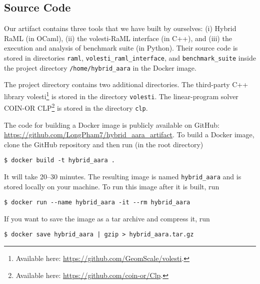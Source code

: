 \subsection{Source Code}

Our artifact contains three tools that we have built by ourselves: (i) Hybrid
RaML (in OCaml), (ii) the volesti-RaML interface (in C++), and (iii) the
execution and analysis of benchmark suite (in Python).
%
Their source code is stored in directories \texttt{raml},
\texttt{volesti\_raml\_interface}, and \texttt{benchmark\_suite} inside the
project directory \texttt{/home/hybrid\_aara} in the Docker image.

The project directory contains two additional directories.
%
The third-party C++ library volesti\footnote{Available here:
\url{https://github.com/GeomScale/volesti}.} is stored in the directory
\texttt{volesti}.
%
The linear-program solver COIN-OR CLP\footnote{Available here:
\url{https://github.com/coin-or/Clp}.} is stored in the directory \texttt{clp}.

The code for building a Docker image is publicly available on GitHub:
\url{https://github.com/LongPham7/hybrid_aara_artifact}.
%
To build a Docker image, clone the GitHub repository and then run (in the root
directory)
\begin{verbatim}
$ docker build -t hybrid_aara .
\end{verbatim}
%
It will take 20--30 minutes.
%
The resulting image is named \texttt{hybrid\_aara} and is stored locally on your
machine.
%
To run this image after it is built, run
\begin{verbatim}
$ docker run --name hybrid_aara -it --rm hybrid_aara
\end{verbatim}
%
If you want to save the image as a tar archive and compress it, run
\begin{verbatim}
$ docker save hybrid_aara | gzip > hybrid_aara.tar.gz
\end{verbatim}

